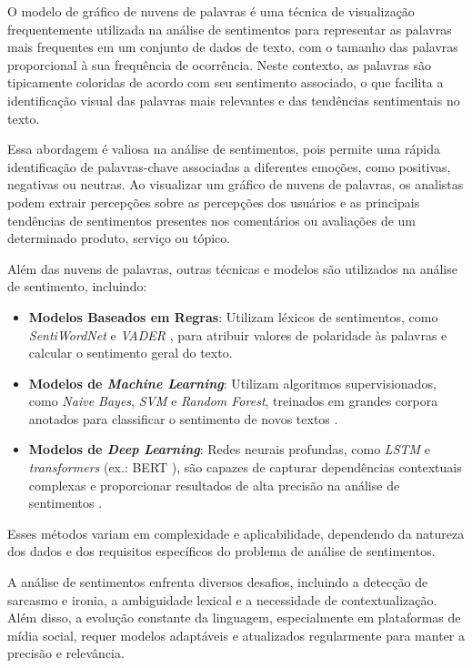 O modelo de gráfico de nuvens de palavras é uma técnica de visualização frequentemente utilizada na análise de sentimentos para representar as palavras mais frequentes em um conjunto de dados de texto, com o tamanho das palavras proporcional à sua frequência de ocorrência. Neste contexto, as palavras são tipicamente coloridas de acordo com seu sentimento associado, o que facilita a identificação visual das palavras mais relevantes e das tendências sentimentais no texto.

Essa abordagem é valiosa na análise de sentimentos, pois permite uma rápida identificação de palavras-chave associadas a diferentes emoções, como positivas, negativas ou neutras. Ao visualizar um gráfico de nuvens de palavras, os analistas podem extrair percepções sobre as percepções dos usuários e as principais tendências de sentimentos presentes nos comentários ou avaliações de um determinado produto, serviço ou tópico.

Além das nuvens de palavras, outras técnicas e modelos são utilizados na análise de sentimento, incluindo:

\begin{itemize}
    \item \textbf{Modelos Baseados em Regras}: Utilizam léxicos de sentimentos, como \textit{SentiWordNet} \cite{Baccianella2010} e \textit{VADER} \cite{Hutto2014}, para atribuir valores de polaridade às palavras e calcular o sentimento geral do texto.
    \item \textbf{Modelos de \textit{Machine Learning}}: Utilizam algoritmos supervisionados, como \textit{Naive Bayes}, \textit{SVM} e \textit{Random Forest}, treinados em grandes corpora anotados para classificar o sentimento de novos textos \cite{Pang2002, Liu2012}.
    \item \textbf{Modelos de \textit{Deep Learning}}: Redes neurais profundas, como \textit{LSTM} e \textit{transformers} (ex.: BERT \cite{Devlin2019}), são capazes de capturar dependências contextuais complexas e proporcionar resultados de alta precisão na análise de sentimentos \cite{Zhang2018}.
\end{itemize}

Esses métodos variam em complexidade e aplicabilidade, dependendo da natureza dos dados e dos requisitos específicos do problema de análise de sentimentos.

A análise de sentimentos enfrenta diversos desafios, incluindo a detecção de sarcasmo e ironia, a ambiguidade lexical e a necessidade de contextualização. Além disso, a evolução constante da linguagem, especialmente em plataformas de mídia social, requer modelos adaptáveis e atualizados regularmente para manter a precisão e relevância.

